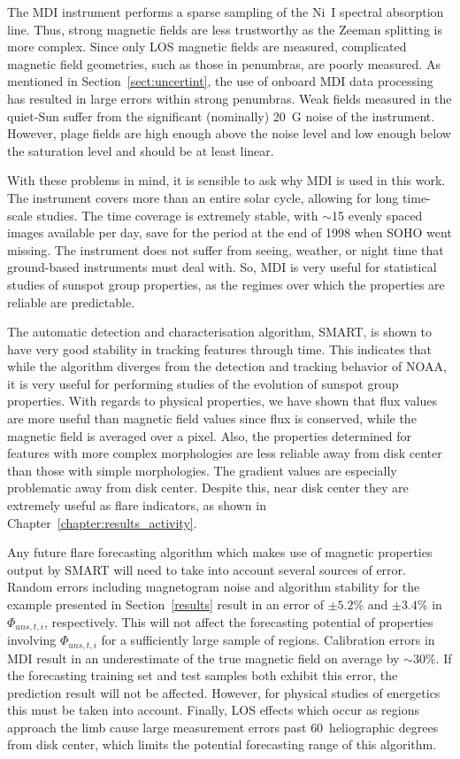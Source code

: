 The \gls{MDI} instrument performs a sparse sampling of the Ni~I spectral absorption line. Thus, strong magnetic fields are less trustworthy as the Zeeman splitting is more complex. Since only \gls{LOS} magnetic fields are measured, complicated magnetic field geometries, such as those in \glspl{penumbra}, are poorly measured. As mentioned in Section~\ref{sect:uncertint}, the use of onboard \gls{MDI} data processing has resulted in large errors within strong \glspl{penumbra}. Weak fields measured in the quiet-Sun suffer from the significant (nominally) 20~G noise of the instrument. However, plage fields are high enough above the noise level and low enough below the saturation level and should be at least linear. 

With these problems in mind, it is sensible to ask why \gls{MDI} is used in this work. The instrument covers more than an entire solar cycle, allowing for long time-scale studies. The time coverage is extremely stable, with $\sim$15 evenly spaced images available per day, save for the period at the end of 1998 when \gls{SOHO} went missing. The instrument does not suffer from seeing, weather, or night time that ground-based instruments must deal with. So, \gls{MDI} is very useful for statistical studies of sunspot group properties, as the regimes over which the properties are reliable are predictable.

The automatic detection and characterisation algorithm, \gls{SMART}, is shown to have very good stability in tracking features through time. This indicates that while the algorithm diverges from the detection and tracking behavior of \gls{NOAA}, it is very useful for performing studies of the evolution of sunspot group properties. With regards to physical properties, we have shown that flux values are more useful than magnetic field values since flux is conserved, while the magnetic field is averaged over a pixel. Also, the properties determined for features with more complex morphologies are less reliable away from disk center than those with simple morphologies. The gradient values are especially problematic away from disk center. Despite this, near disk center they are extremely useful as flare indicators, as shown in Chapter~\ref{chapter:results_activity}.

Any future flare forecasting algorithm which makes use of magnetic properties output by \gls{SMART} will need to take into account several sources of error. Random errors including magnetogram noise and algorithm stability for the example presented in Section~\ref{results} result in an error of $\pm5.2\%$ and $\pm3.4\%$ in $\Phi_{uns,t,i}$, respectively. This will not affect the forecasting potential of properties involving ${\Phi}_{uns,t,i}$ for a sufficiently large sample of regions. Calibration errors in MDI result in an underestimate of the true magnetic field on average by $\sim$$30\%$. If the forecasting training set and test samples both exhibit this error, the prediction result will not be affected. However, for physical studies of energetics this must be taken into account. Finally, \gls{LOS} effects which occur as regions approach the limb cause large measurement errors past $60$~heliographic degrees from disk center, which limits the potential forecasting range of this algorithm. 


